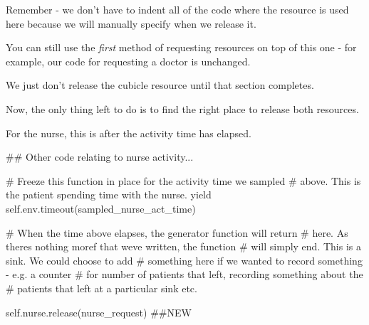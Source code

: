 \documentclass[
  letterpaper,
  DIV=11,
  numbers=noendperiod]{scrreprt}
\newenvironment{Shaded}{\begin{snugshade}}{\end{snugshade}}
\newcommand{\CommentTok}[1]{\textcolor[rgb]{0.37,0.37,0.37}{#1}}
\newcommand{\ControlFlowTok}[1]{\textcolor[rgb]{0.00,0.23,0.31}{#1}}
\newcommand{\NormalTok}[1]{\textcolor[rgb]{0.00,0.23,0.31}{#1}}
\newcommand{\VariableTok}[1]{\textcolor[rgb]{0.07,0.07,0.07}{#1}}
\begin{document}
\begin{tcolorbox}[enhanced jigsaw, rightrule=.15mm, colback=white, colframe=quarto-callout-tip-color-frame, colbacktitle=quarto-callout-tip-color!10!white, toprule=.15mm, coltitle=black, opacityback=0, titlerule=0mm, bottomtitle=1mm, breakable, title=\textcolor{quarto-callout-tip-color}{\faLightbulb}\hspace{0.5em}{Tip}, opacitybacktitle=0.6, toptitle=1mm, arc=.35mm, bottomrule=.15mm, leftrule=.75mm, left=2mm]

Remember - we don't have to indent all of the code where the resource is
used here because we will manually specify when we release it.

You can still use the \emph{first} method of requesting resources on top
of this one - for example, our code for requesting a doctor is
unchanged.

We just don't release the cubicle resource until that section completes.

\end{tcolorbox}

Now, the only thing left to do is to find the right place to release
both resources.

For the nurse, this is after the activity time has elapsed.

\begin{Shaded}
\begin{Highlighting}[]
\CommentTok{\#\# Other code relating to nurse activity...}

\CommentTok{\# Freeze this function in place for the activity time we sampled}
\CommentTok{\# above.  This is the patient spending time with the nurse.}
\ControlFlowTok{yield} \VariableTok{self}\NormalTok{.env.timeout(sampled\_nurse\_act\_time)}

\CommentTok{\# When the time above elapses, the generator function will return}
\CommentTok{\# here.  As there\textquotesingle{}s nothing moref that we\textquotesingle{}ve written, the function}
\CommentTok{\# will simply end.  This is a sink.  We could choose to add}
\CommentTok{\# something here if we wanted to record something {-} e.g. a counter}
\CommentTok{\# for number of patients that left, recording something about the}
\CommentTok{\# patients that left at a particular sink etc.}

\VariableTok{self}\NormalTok{.nurse.release(nurse\_request) }\CommentTok{\#\#NEW}
\end{Highlighting}
\end{Shaded}
\end{document}
